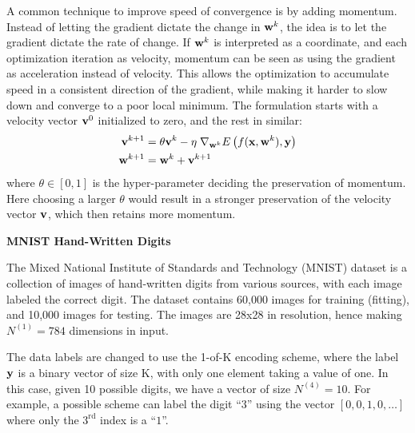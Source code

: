 A common technique to improve speed of convergence 
is by adding momentum.
Instead of letting the gradient dictate the change in $\mathbf{w}^k$,
the idea is to let the gradient dictate the rate of change.
If $\mathbf{w}^k$ is interpreted as a coordinate,
and each optimization iteration as velocity,
momentum can be seen as using the gradient as acceleration
instead of velocity. 
This allows the optimization to accumulate speed in 
a consistent direction of the gradient, 
while making it harder to slow down and 
converge to a poor local minimum.
The formulation starts with a velocity vector $\mathbf{v}^0$
initialized to zero, and the rest in similar:
%
\begin{equation}
\begin{aligned}
	\mathbf{v}^{k+1} &= \theta \mathbf{v}^{k} - \eta \; \nabla_{\mathbf{w}^k} 
				E\left(f(\mathbf{x},\mathbf{w}^k),\mathbf{y}\right) \\
	\mathbf{w}^{k+1} &= \mathbf{w}^{k} + \mathbf{v}^{k+1}
\end{aligned}
\end{equation}
%
where $\theta \in [0,1]$ is the hyper-parameter 
deciding the preservation of momentum.
Here choosing a larger $\theta$ would result in a stronger 
preservation of the velocity vector $\mathbf{v}$,
which then retains more momentum.

\pagebreak
\noindent
\large
{\bf MNIST Hand-Written Digits}
\normalsize

The Mixed National Institute of Standards and Technology
(MNIST) dataset is a collection of images of hand-written digits
from various sources,
with each image labeled the correct digit.
The dataset contains 60,000 images for training (fitting),
and 10,000 images for testing.
The images are 28x28 in resolution,
hence making $N^{(1)} = 784$ dimensions in input.

The data labels are changed to use the 1-of-K encoding scheme,
where the label $\mathbf{y}$ is a binary vector of size K,
with only one element taking a value of one.
In this case, given 10 possible digits,
we have a vector of size $N^{(4)} = 10$.
For example, a possible scheme can label the digit ``$3$'' 
using the vector $[0,0,1,0,\ldots]$ where 
only the $3^\text{rd}$ index is a ``$1$''.

